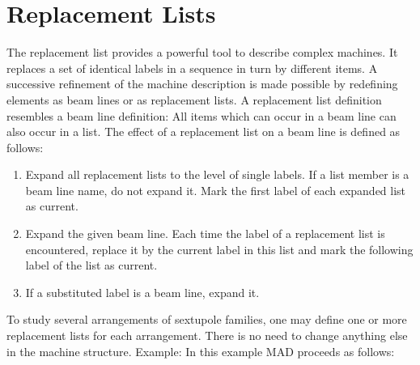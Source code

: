 \section{Replacement Lists}
\label{S-LIST}
The replacement list provides a powerful tool
to describe complex machines.
It replaces a set of identical labels in a sequence in turn
by different items.
A successive refinement of the machine description is made possible
by redefining elements as beam lines or as replacement lists.
A replacement list definition resembles a beam line definition:
All items which can occur in a beam line can also occur in a list.
The effect of a replacement list on a beam line is defined as follows:
\begin{enumerate}
\item Expand all replacement lists to the level of single labels.
If a list member is a beam line name, do not expand it.
Mark the first label of each expanded list as current.
\item Expand the given beam line.
Each time the label of a replacement list is encountered,
replace it by the current label in this list
and mark the following label of the list as current.
\item If a substituted label is a beam line, expand it.
\end{enumerate}
To study several arrangements of sextupole families,
one may define one or more replacement lists for each
arrangement.
There is no need to change anything else in the machine structure.
Example:
In this example MAD proceeds as follows:
